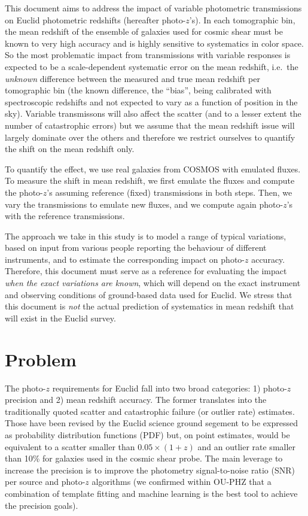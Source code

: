 \documentclass{article}
\begin{document}
This document aims to address the impact of variable photometric
transmissions on Euclid photometric redshifts (hereafter photo-\(z\)'s).
In each tomographic bin, the mean redshift of the ensemble of galaxies
used for cosmic shear must be known to very high accuracy and is highly
sensitive to systematics in color space. So the most problematic impact
from transmissions with variable responses is expected to be a
scale-dependent systematic error on the mean redshift, i.e.~the
\emph{unknown} difference between the measured and true mean redshift
per tomographic bin (the known difference, the ``bias'', being
calibrated with spectroscopic redshifts and not expected to vary as a
function of position in the sky). Variable transmissons will also affect
the scatter (and to a lesser extent the number of catastrophic errors)
but we assume that the mean redshift issue will largely dominate over
the others and therefore we restrict ourselves to quantify the shift on
the mean redshift only.

To quantify the effect, we use real galaxies from COSMOS with emulated
fluxes. To measure the shift in mean redshift, we first emulate the
fluxes and compute the photo-\(z\)'s assuming reference (fixed)
transmissions in both steps. Then, we vary the transmissions to emulate
new fluxes, and we compute again photo-\(z\)'s with the reference
transmissions.

The approach we take in this study is to model a range of typical
variations, based on input from various people reporting the behaviour
of different instruments, and to estimate the corresponding impact on
photo-\(z\) accuracy. Therefore, this document must serve as a reference
for evaluating the impact \emph{when the exact variations are known},
which will depend on the exact instrument and observing conditions of
ground-based data used for Euclid. We stress that this document is
\emph{not} the actual prediction of systematics in mean redshift that
will exist in the Euclid survey.

\hypertarget{problem}{%
\section{Problem}\label{problem}}

The photo-\(z\) requirements for Euclid fall into two broad categories:
1) photo-\(z\) precision and 2) mean redshift accuracy. The former
translates into the traditionally quoted scatter and catastrophic
failure (or outlier rate) estimates. Those have been revised by the
Euclid science ground segement to be expressed as probability
distribution functions (PDF) but, on point estimates, would be
equivalent to a scatter smaller than \(0.05\times(1+z)\) and an outlier
rate smaller than 10\% for galaxies used in the cosmic shear probe. The
main leverage to increase the precision is to improve the photometry
signal-to-noise ratio (SNR) per source and photo-\(z\) algorithms (we
confirmed within OU-PHZ that a combination of template fitting and
machine learning is the best tool to achieve the precision goals).
\end{document}
